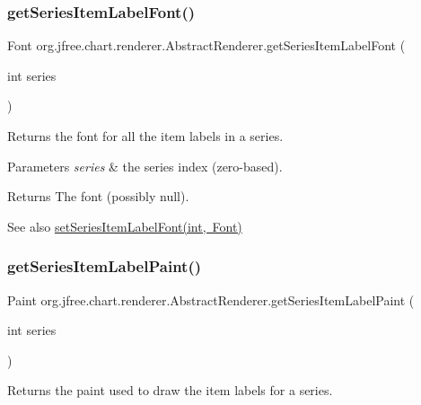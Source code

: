 \subsubsection{\texorpdfstring{get\+Series\+Item\+Label\+Font()}{getSeriesItemLabelFont()}}
{\footnotesize\ttfamily Font org.\+jfree.\+chart.\+renderer.\+Abstract\+Renderer.\+get\+Series\+Item\+Label\+Font (\begin{DoxyParamCaption}\item[{int}]{series }\end{DoxyParamCaption})}

Returns the font for all the item labels in a series.


\begin{DoxyParams}{Parameters}
{\em series} & the series index (zero-\/based).\\
\hline
\end{DoxyParams}
\begin{DoxyReturn}{Returns}
The font (possibly {\ttfamily null}).
\end{DoxyReturn}
\begin{DoxySeeAlso}{See also}
\mbox{\hyperlink{classorg_1_1jfree_1_1chart_1_1renderer_1_1_abstract_renderer_a1da57ed2b155402a119f2c727c07cefe}{set\+Series\+Item\+Label\+Font(int, Font)}} 
\end{DoxySeeAlso}
\mbox{\label{classorg_1_1jfree_1_1chart_1_1renderer_1_1_abstract_renderer_a529914230c394fd2600e3aa35d529b63}} 
\subsubsection{\texorpdfstring{get\+Series\+Item\+Label\+Paint()}{getSeriesItemLabelPaint()}}
{\footnotesize\ttfamily Paint org.\+jfree.\+chart.\+renderer.\+Abstract\+Renderer.\+get\+Series\+Item\+Label\+Paint (\begin{DoxyParamCaption}\item[{int}]{series }\end{DoxyParamCaption})}

Returns the paint used to draw the item labels for a series.


